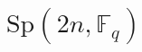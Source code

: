 \documentclass[11pt,oneside]{article}
\newcommand{\Sp}{\mathrm{Sp}}
\newcommand{\Field}{\mathbb{F}}
\begin{document}
%




\section{$\Sp(2n,\Field_q)$}

% 
\end{document}
